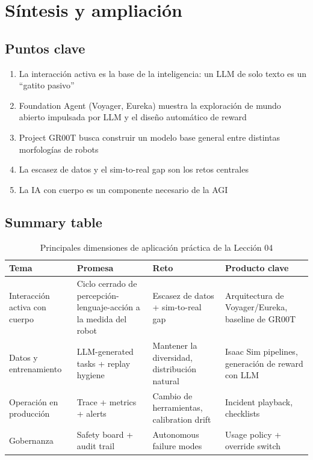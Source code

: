 \section{Síntesis y ampliación}

\subsection{Puntos clave}

\begin{enumerate}
    \item La interacción activa es la base de la inteligencia: un LLM de solo texto es un ``gatito pasivo''
    \item Foundation Agent (Voyager, Eureka) muestra la exploración de mundo abierto impulsada por LLM y el diseño automático de reward
    \item Project GR00T busca construir un modelo base general entre distintas morfologías de robots
    \item La escasez de datos y el sim-to-real gap son los retos centrales
    \item La IA con cuerpo es un componente necesario de la AGI
\end{enumerate}

\subsection{Summary table}

\begin{table}[H]
\centering
\begin{tabular}{p{} p{} p{} p{}}
\toprule
Tema & Promesa & Reto & Producto clave \\
\midrule
Interacción activa con cuerpo & Ciclo cerrado de percepción-lenguaje-acción a la medida del robot & Escasez de datos + sim-to-real gap & Arquitectura de Voyager/Eureka, baseline de GR00T \\
Datos y entrenamiento & LLM-generated tasks + replay hygiene & Mantener la diversidad, distribución natural & Isaac Sim pipelines, generación de reward con LLM \\
Operación en producción & Trace + metrics + alerts & Cambio de herramientas, calibration drift & Incident playback, checklists \\
Gobernanza & Safety board + audit trail & Autonomous failure modes & Usage policy + override switch \\
\bottomrule
\end{tabular}
\caption{Principales dimensiones de aplicación práctica de la Lección 04}
\end{table}

